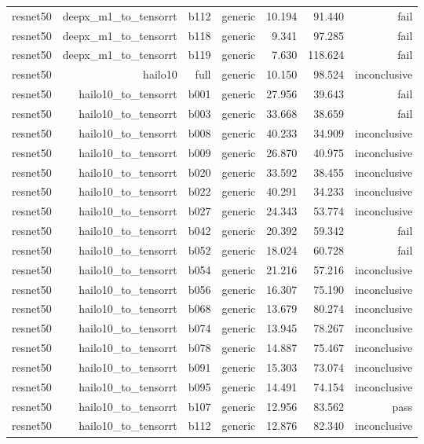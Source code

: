 \begin{table}[t]
\begin{tabular}{lrrrrrr}
resnet50 & deepx\_m1\_to\_tensorrt & b112 & generic & 10.194 & 91.440 & fail \\
resnet50 & deepx\_m1\_to\_tensorrt & b118 & generic & 9.341 & 97.285 & fail \\
resnet50 & deepx\_m1\_to\_tensorrt & b119 & generic & 7.630 & 118.624 & fail \\
resnet50 & hailo10 & full & generic & 10.150 & 98.524 & inconclusive \\
resnet50 & hailo10\_to\_tensorrt & b001 & generic & 27.956 & 39.643 & fail \\
resnet50 & hailo10\_to\_tensorrt & b003 & generic & 33.668 & 38.659 & fail \\
resnet50 & hailo10\_to\_tensorrt & b008 & generic & 40.233 & 34.909 & inconclusive \\
resnet50 & hailo10\_to\_tensorrt & b009 & generic & 26.870 & 40.975 & inconclusive \\
resnet50 & hailo10\_to\_tensorrt & b020 & generic & 33.592 & 38.455 & inconclusive \\
resnet50 & hailo10\_to\_tensorrt & b022 & generic & 40.291 & 34.233 & inconclusive \\
resnet50 & hailo10\_to\_tensorrt & b027 & generic & 24.343 & 53.774 & inconclusive \\
resnet50 & hailo10\_to\_tensorrt & b042 & generic & 20.392 & 59.342 & fail \\
resnet50 & hailo10\_to\_tensorrt & b052 & generic & 18.024 & 60.728 & fail \\
resnet50 & hailo10\_to\_tensorrt & b054 & generic & 21.216 & 57.216 & inconclusive \\
resnet50 & hailo10\_to\_tensorrt & b056 & generic & 16.307 & 75.190 & inconclusive \\
resnet50 & hailo10\_to\_tensorrt & b068 & generic & 13.679 & 80.274 & inconclusive \\
resnet50 & hailo10\_to\_tensorrt & b074 & generic & 13.945 & 78.267 & inconclusive \\
resnet50 & hailo10\_to\_tensorrt & b078 & generic & 14.887 & 75.467 & inconclusive \\
resnet50 & hailo10\_to\_tensorrt & b091 & generic & 15.303 & 73.074 & inconclusive \\
resnet50 & hailo10\_to\_tensorrt & b095 & generic & 14.491 & 74.154 & inconclusive \\
resnet50 & hailo10\_to\_tensorrt & b107 & generic & 12.956 & 83.562 & pass \\
resnet50 & hailo10\_to\_tensorrt & b112 & generic & 12.876 & 82.340 & inconclusive \\

\end{tabular}
\end{table}
